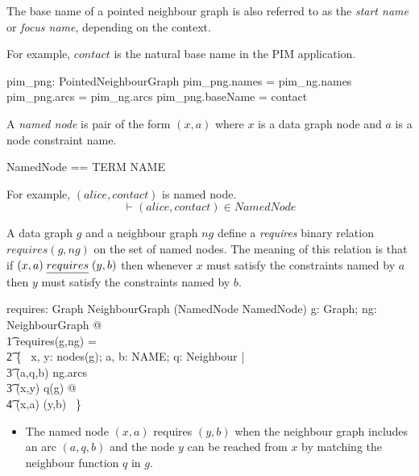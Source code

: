 \documentclass{article}
\begin{document}
The base name of a pointed neighbour graph is also referred to as the {\em start name} or {\em focus name}, depending on the context.

For example, $contact$ is the natural base name in the PIM application.
\begin{axdef}
	pim\_png: PointedNeighbourGraph
\where
	pim\_png.names = pim\_ng.names
\also
	pim\_png.arcs = pim\_ng.arcs
\also
	pim\_png.baseName = contact
\end{axdef}

A {\em named node} is pair of the form $(x,a)$ where $x$ is a data graph node and $a$ is a node constraint name.
\begin{zed}
NamedNode == TERM \cross NAME
\end{zed}

For example, $(alice, contact)$ is named node.
\[\vdash
	(alice,contact) \in NamedNode
\]

A data graph $g$ and a neighbour graph $ng$ define a {\em requires} binary relation $requires(g,ng)$ on the set of named nodes.
The meaning of this relation is that if $(x,a) \mathrel{\underline{requires}} (y,b)$ then whenever $x$ must satisfy the constraints named by $a$ then
$y$ must satisfy the constraints named by $b$.
\begin{axdef}
requires: Graph \cross NeighbourGraph \fun (NamedNode \rel NamedNode)
\where
\forall g: Graph; ng: NeighbourGraph @ \\
\t1 requires(g,ng) = \\
\t2		\{~ x, y: nodes(g); a, b: NAME; q: Neighbour | \\
\t3			(a,q,b) \in ng.arcs \land \\
\t3			(x,y) \in q(g) @ \\
\t4				(x,a) \mapsto (y,b) ~\}
\end{axdef}
\begin{itemize}
\item The named node $(x,a)$ requires $(y,b)$ when the neighbour graph includes an arc $(a,q,b)$ and the node $y$ can be
reached from $x$ by matching the neighbour function $q$ in $g$.
\end{itemize}
\end{document}
